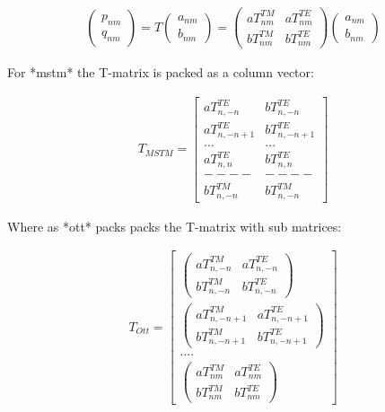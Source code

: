 \documentclass[a4paper,oneside,11pt]{book}
\begin{document}
\begin{align}
	\begin{pmatrix}
		p_{nm}\\
		q_{nm}
	\end{pmatrix} =T 
	\begin{pmatrix}
		a_{nm}\\
		b_{nm}
	\end{pmatrix} = 
	\begin{pmatrix}
		aT^{TM}_{nm} & aT^{TE}_{nm}\\ 
		bT^{TM}_{nm} & bT^{TE}_{nm}
	\end{pmatrix}
	\begin{pmatrix}
		a_{nm}\\
		b_{nm}
	\end{pmatrix}
\end{align} 

For *mstm* the T-matrix is packed as a column vector:

\begin{align}
	T_{MSTM} = 
	\begin{bmatrix} 
		aT^{TE}_{n,-n} & bT^{TE}_{n,-n} \\ 
		aT^{TE}_{n, -n+1} & bT^{TE}_{n, -n+1} \\ 
		... & ...\\ 
		aT^{TE}_{n,n} & bT^{TE}_{n,n} \\ 
		----&----\\ 
		bT^{TM}_{n,-n} &bT^{TM}_{n,-n} 
	\end{bmatrix}
\end{align}

Where as *ott* packs packs the T-matrix with sub matrices:

\begin{align}
	T_{Ott} = 
	\begin{bmatrix} 
		\begin{pmatrix}
			aT^{TM}_{n,-n} & aT^{TE}_{n,-n}\\ 
			bT^{TM}_{n,-n}&bT^{TE}_{n,-n}
		\end{pmatrix} \\ 
		\begin{pmatrix}
			aT^{TM}_{n,-n+1} & aT^{TE}_{n,-n+1}\\ 
			bT^{TM}_{n,-n+1} & bT^{TE}_{n,-n+1}
		\end{pmatrix}\\
		....\\ 
		\begin{pmatrix}
			aT^{TM}_{nm} & aT^{TE}_{nm}\\ 
			bT^{TM}_{nm} & bT^{TE}_{nm}
		\end{pmatrix}
	\end{bmatrix}
\end{align}
\end{document}

